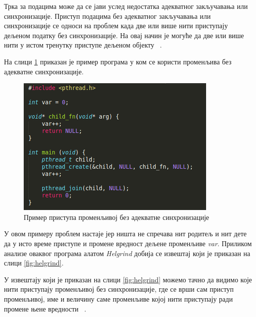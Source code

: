 \documentclass[12pt,oneside]{memoir}
\begin{document}
\indent Трка за подацима може да се јави услед недостатка адекватног закључавања или синхронизације. Приступ подацима без адекватног закључавања или синхронизације се односи на проблем када две или више нити приступају дељеном податку без синхронизације. На овај начин је могуће да две или више нити у истом тренутку приступе дељеном објекту ~\cite{helgrindRef}.

\indent На слици \ref{fig:main4} приказан је пример програма у ком се користи променљива без адекватне синхронизације.

\begin{figure}[h!]
\begin{center}
\includegraphics[scale=0.75]{slika14.png}
\end{center}
\caption{Пример приступа променљивој без адекватне синхронизације}
\label{fig:main4}
\end{figure}


\indent У овом примеру проблем настаје јер ништа не спречава нит родитељ и нит дете да у исто време приступе и промене вредност дељене променљиве \textit{var}. Приликом анализе оваквог програма алатом \textit{Helgrind} добија се извештај који је приказан на слици \ref{fig:helgrind}.

\indent У извештају који је приказан на слици \ref{fig:helgrind} можемо тачно да видимо које нити приступају променљивој без синхронизације, где се врши сам приступ променљивој, име и величину саме променљиве којој нити приступају ради промене њене вредности ~\cite{helgrindRef}.
\end{document}
